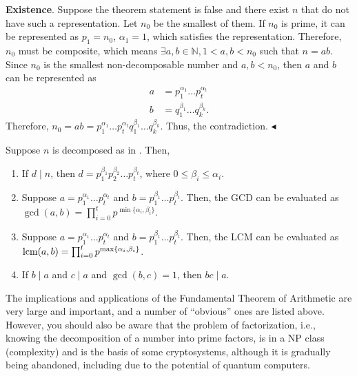 \documentclass[../lecture-notes-148x210.tex]{subfiles}
\begin{document}
\textcolor{green!60!black}{\textbf{Existence}}. Suppose the theorem statement is false and there exist $n$ that do not have such a representation.
Let $n_0$ be the smallest of them.
If $n_0$ is prime, it can be represented as $p_1=n_0$, $\alpha_1=1$, which satisfies the representation. Therefore, $n_0$ must be composite, which means $\exists a, b \in \mathbb{N}, 1 < a, b < n_0$ such that $n = ab$.
Since $n_0$ is the smallest non-decomposable number and $a, b < n_0$, then $a$ and $b$ can be represented as 
\begin{align*}
    a &= p_{1}^{\alpha_{1}} \dots p_{t}^{\alpha_{t}} \\
    b &= q_{1}^{\beta_{1}} \dots q_{k}^{\beta_{k}}.
\end{align*}
Therefore, $n_0 = ab=p_{1}^{\alpha_{1}} \dots p_{t}^{\alpha_{t}} q_{1}^{\beta_{1}} \dots q_{k}^{\beta_{k}}$. Thus, the contradiction. $\blacktriangleleft$  

\begin{corollary}
    Suppose $n$ is decomposed as in . Then,

    \begin{enumerate}
        \item If $d \mid n$, then $d = p_{1}^{\beta_1}p_{2}^{\beta_2} \dots p_{t}^{\beta_t}$, where $0 \leq \beta_i \leq \alpha_i$.
        \item Suppose $a = p_{1}^{\alpha_1} \dots p_{t}^{\alpha_t}$ and $b = p_{1}^{\beta_1} \dots p_{t}^{\beta_t}$. Then, the GCD can be evaluated as $\gcd(a, b) = \prod_{i=0}^{t}p^{\min\{\alpha_i, \beta_i\}}$.
        \item Suppose $a = p_{1}^{\alpha_1} \dots p_{t}^{\alpha_t}$ and $b = p_{1}^{\beta_1} \dots p_{t}^{\beta_t}$. Then, the LCM can be evaluated as $\text{lcm}(a, b) = \prod_{i=0}^{t}p^{\max\{\alpha_i, \beta_i\}}$.
        \item If $b \mid a$ and $c \mid a$ and $\gcd(b, c) = 1$, then $bc \mid a$.
    \end{enumerate}
\end{corollary}

The implications and applications of the Fundamental Theorem of Arithmetic are very large and important, and a number of “obvious” ones are listed above.
However, you should also be aware that the problem of factorization, i.e., knowing the decomposition of a number into prime factors, is in a NP class (complexity) and is the basis of some cryptosystems, although it is gradually being abandoned, including due to the potential of quantum computers.
\end{document}

